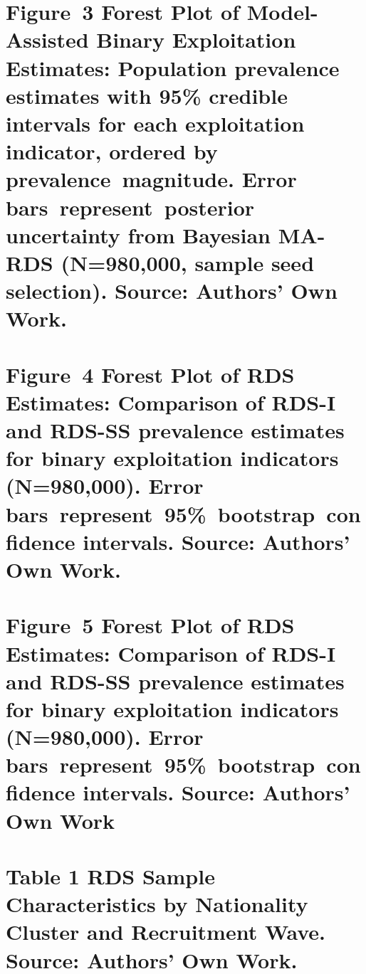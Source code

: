 \documentclass[
  12pt,
  letterpaper,
  DIV=11,
  numbers=noendperiod]{scrartcl}
\begin{document}
\section{Figure~3 Forest Plot of Model-Assisted Binary Exploitation
Estimates: Population prevalence estimates with 95\% credible intervals
for each exploitation indicator, ordered by prevalence~magnitude. Error
bars~represent~posterior uncertainty from Bayesian MA-RDS (N=980,000,
sample seed selection). Source: Authors' Own
Work.~}\label{figure-3-forest-plot-of-model-assisted-binary-exploitation-estimates-population-prevalence-estimates-with-95-credible-intervals-for-each-exploitation-indicator-ordered-by-prevalence-magnitude.-error-bars-represent-posterior-uncertainty-from-bayesian-ma-rds-n980000-sample-seed-selection.-source-authors-own-work.}

\section{Figure~4 Forest Plot of RDS Estimates: Comparison of RDS-I and
RDS-SS prevalence estimates for binary exploitation indicators
(N=980,000). Error bars~represent~95\%~bootstrap~confidence intervals.
Source: Authors' Own
Work.~}\label{figure-4-forest-plot-of-rds-estimates-comparison-of-rds-i-and-rds-ss-prevalence-estimates-for-binary-exploitation-indicators-n980000.-error-bars-represent-95-bootstrap-confidence-intervals.-source-authors-own-work.}

\section{Figure~5 Forest Plot of RDS Estimates: Comparison of RDS-I and
RDS-SS prevalence estimates for binary exploitation indicators
(N=980,000). Error bars~represent~95\%~bootstrap~confidence intervals.
Source: Authors' Own
Work}\label{figure-5-forest-plot-of-rds-estimates-comparison-of-rds-i-and-rds-ss-prevalence-estimates-for-binary-exploitation-indicators-n980000.-error-bars-represent-95-bootstrap-confidence-intervals.-source-authors-own-work}

\section{Table 1 RDS Sample Characteristics by Nationality Cluster and
Recruitment Wave. Source: Authors' Own
Work.~}\label{table-1-rds-sample-characteristics-by-nationality-cluster-and-recruitment-wave.-source-authors-own-work.}
\end{document}
